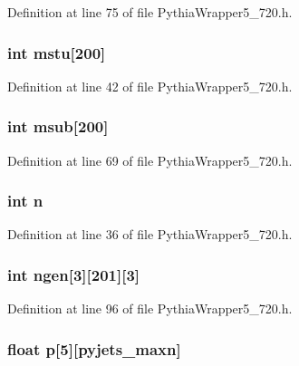 Definition at line 75 of file Pythia\-Wrapper5\_\-720.h.
\subsubsection{\setlength{\rightskip}{0pt plus 5cm}int {\bf mstu}[200]}\label{PythiaWrapper5__720_8h_54fee093d39e3b7961c31466f751ea2b}




Definition at line 42 of file Pythia\-Wrapper5\_\-720.h.
\subsubsection{\setlength{\rightskip}{0pt plus 5cm}int {\bf msub}[200]}\label{PythiaWrapper5__720_8h_eed1d64e7652af12abc36546bc38b7d6}




Definition at line 69 of file Pythia\-Wrapper5\_\-720.h.
\subsubsection{\setlength{\rightskip}{0pt plus 5cm}int {\bf n}}\label{PythiaWrapper5__720_8h_76f11d9a0a47b94f72c2d0e77fb32240}




Definition at line 36 of file Pythia\-Wrapper5\_\-720.h.
\subsubsection{\setlength{\rightskip}{0pt plus 5cm}int {\bf ngen}[3][201][3]}\label{PythiaWrapper5__720_8h_17f55684cdf140321ab4d91722dfb172}




Definition at line 96 of file Pythia\-Wrapper5\_\-720.h.
\subsubsection{\setlength{\rightskip}{0pt plus 5cm}float {\bf p}[5][{\bf pyjets\_\-maxn}]}\label{PythiaWrapper5__720_8h_8e241458f851615b53df90ab6231f85e}


